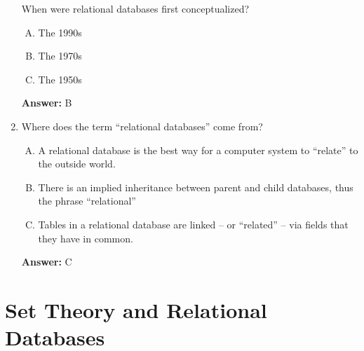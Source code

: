 \documentclass[12pt]{article}
\begin{document}
\begin{enumerate}[1.]
    When were relational databases first conceptualized?

    \bigskip

    \begin{enumerate}[A.]
        \item The 1990s
        \item The 1970s
        \item The 1950s
    \end{enumerate}

    \bigskip

    \textbf{Answer:} B

    \item

    Where does the term “relational databases” come from?

    \bigskip

    \begin{enumerate}[A.]
        \item A relational database is the best way for a computer system to “relate” to the outside world.
        \item There is an implied inheritance between parent and child databases, thus the phrase “relational”
        \item Tables in a relational database are linked -- or “related” -- via fields that they have in common.
    \end{enumerate}

    \bigskip

    \textbf{Answer:} C

\end{enumerate}

\bigskip

\section{Set Theory and Relational Databases}

\bigskip
\end{document}

